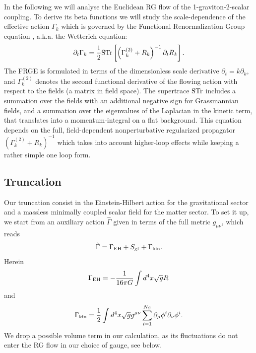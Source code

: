 \documentclass[11pt]{book} %
\newcommand{\be}{\begin{equation}}
\newcommand{\ee}{\end{equation}}
\begin{document}
In the following we will analyse the Euclidean RG flow of the 1-graviton-2-scalar coupling.
To derive its beta functions we will study the scale-dependence of the effective action $\Gamma_k$ which is governed by the Functional Renormalization Group equation \cite{Wetterich:1992yh, Morris:1993qb},
a.k.a. the Wetterich equation:
\be
\partial_t \Gamma_k = \frac{1}{2} {\rm STr} \left[\left( \Gamma_k^{(2)}+R_k\right)^{-1} \partial_t R_k \right].
\ee
The FRGE is formulated in terms of the dimensionless scale derivative $\partial_t = k\partial_k$,
and $\Gamma_k^{(2)}$ denotes the second functional derivative of the flowing action with respect
to the fields (a matrix in field space).
The supertrace $\rm STr$ includes a summation over the fields with an additional negative
sign for Grassmannian fields, and a summation over the eigenvalues of the Laplacian in the kinetic term,
that translates into a momentum-integral on a flat background.
This equation depends on the full, field-dependent nonperturbative regularized propagator
$\left(\Gamma_k^{(2)}+R_k \right)^{-1}$ which takes into account higher-loop effects while
keeping a rather simple  one loop form.

%
\subsection{Truncation}
%
Our truncation consist in the Einstein-Hilbert action for the gravitational sector and
a massless minimally coupled scalar field for the matter sector.
To set it up, we start from an auxiliary action $\hat{\Gamma}$ given in terms of the full
metric $g_{\mu \nu}$, which reads
\be
\hat{\Gamma}= \Gamma_{\rm EH}+ S_{\rm gf} + \Gamma_{\rm kin}.
\ee
Herein
\be
\Gamma_{\rm EH} = -\frac{1}{16 \pi G} \int d^4x \sqrt{g} R\,
\ee
and
\be
\Gamma_{\rm kin} = \frac{1}{2} \int d^4x \sqrt{g} g^{\mu \nu}\sum_{i=1}^{N_S}\partial_{\mu}\phi^i \partial_{\nu}\phi^i.
\ee
We drop a possible volume term in our calculation,
as its fluctuations do not enter the RG flow in our choice of gauge, see below.
\end{document}
